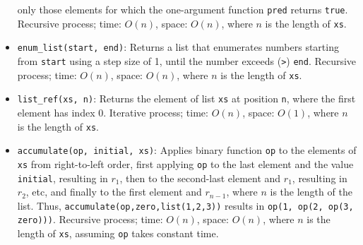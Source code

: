 \begin{itemize}
only those elements for which the one-argument function
\lstinline{pred}
returns \lstinline{true}.
Recursive process;
time: $O(n)$, space: $O(n)$, where $n$ is the length of \lstinline{xs}.
\item \lstinline{enum_list(start, end)}: Returns a list that enumerates
numbers starting from \lstinline{start} using a step size of 1, until
the number exceeds (\lstinline{>}) \lstinline{end}.
Recursive process;
time: $O(n)$, space: $O(n)$, where $n$ is the length of \lstinline{xs}.
\item \lstinline{list_ref(xs, n)}: Returns the element
of list \lstinline{xs} at position \lstinline{n}, 
where the first element has index 0.
Iterative process;
time: $O(n)$, space: $O(1)$, where $n$ is the length of \lstinline{xs}.
\item \lstinline{accumulate(op, initial, xs)}: Applies binary
function \lstinline{op} to the elements of \lstinline{xs} from
right-to-left order, first applying \lstinline{op} to the last element
and the value \lstinline{initial}, resulting in $r_1$, then to the 
second-last element and $r_1$, resulting in $r_2$, etc, and finally
to the first element and $r_{n-1}$, where $n$ is the length of the
list. Thus, \lstinline{accumulate(op,zero,list(1,2,3))} results in
\lstinline{op(1, op(2, op(3, zero)))}.
Recursive process;
time: $O(n)$, space: $O(n)$, where $n$ is the length of \lstinline{xs},
assuming \lstinline{op} takes constant time.
\end{itemize}
